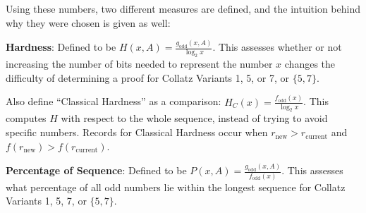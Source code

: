 Using these numbers, two different measures are defined, and the intuition behind why they were chosen is given as well: \par
\textbf{Hardness}: Defined to be $H(x,A) = \frac{g_\text{odd}(x,A)}{\log_2{x}}$. This assesses whether or not increasing the number of bits needed to represent the number $x$ changes the difficulty of determining a proof for Collatz Variants  1, 5, or 7, or $\{5,7\}$.  \par
Also define ``Classical Hardness'' as a comparison: $H_C(x) = \frac{f_\text{odd}(x)}{\log_2{x}}$. This computes $H$ with respect to the whole sequence, instead of trying to avoid specific numbers. Records for Classical Hardness occur when $r_\text{new} > r_\text{current}$ and $f(r_\text{new}) > f(r_\text{current})$. \par
\textbf{Percentage of Sequence}: Defined to be $P(x,A) = \frac{g_\text{odd}(x,A)}{f_\text{odd}(x)}$. This assesses what percentage of all odd numbers lie within the longest sequence for Collatz Variants 1, 5, 7, or $\{5,7\}$.


